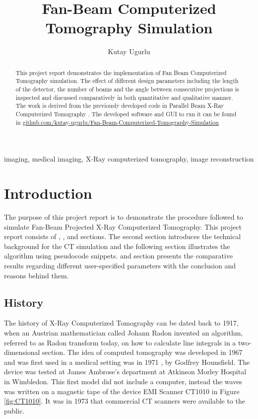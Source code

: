 \documentclass[journal]{IEEEtran}
\title{Fan-Beam Computerized Tomography Simulation}
\author{Kutay Ugurlu}
\begin{document}

\maketitle

\begin{abstract}This project report demonstrates the implementation of Fan Beam Computerized Tomography simulation. The effect of different design parameters including the length of the detector, the number of beams and the angle between consecutive projections is inspected and discussed comparatively in both quantitative and qualitative manner. The work is derived from the previously developed code in Parallel Beam X-Ray Computerized Tomography \cite{ugurlu2021}. The developed software and GUI to run it can be found in \href{https://github.com/kutay-ugurlu/Fan-Beam-Computerized-Tomography-Simulation}{github.com/kutay-ugurlu/Fan-Beam-Computerized-Tomography-Simulation} \\
\end{abstract}
\begin{IEEEkeywords}
	imaging, medical imaging, X-Ray computerized tomography, image reconstruction
\end{IEEEkeywords}

\section{Introduction} \label{sec:intro}
The purpose of this project report is to demonstrate the procedure followed to simulate Fan-Beam Projected X-Ray Computerized Tomography. This project report consists of , ,  and  sections. The second section introduces the technical background for the CT simulation and the following section illustrates the algorithm using pseudocode snippets.  and  section presents the comparative results regarding different user-specified parameters with the conclusion and reasons behind them.

\subsection{History}
The history of X-Ray Computerized Tomography can be dated back to 1917, when an Austrian mathematician called Johann Radon invented an algorithm, referred to as Radon transform today, on how to calculate line integrals in a two-dimensional section. The idea of computed tomography was developed in 1967 and was first used in a medical setting was in 1971 \cite{richmond2004sir}, by Godfrey Hounsfield. The device was tested at
James Ambrose’s department at Atkinson Morley Hospital in Wimbledon. This first model did not include a computer, instead the waves was written on a magnetic tape of the device EMI Scanner CT1010 in Figure \ref{fig:CT1010}. It was in 1973 that commercial CT scanners were available to the public. \cite{CTHist}
\end{document}
